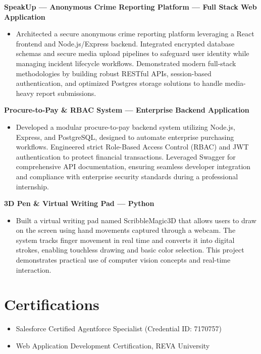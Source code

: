 \documentclass[10pt,letterpaper]{article}
\begin{document}
\vspace{4pt}
\noindent
\textbf{SpeakUp --- Anonymous Crime Reporting Platform --- Full Stack Web Application}
\begin{itemize}[leftmargin=0.2in, nosep, topsep=1pt]
    \item Architected a secure anonymous crime reporting platform leveraging a React frontend and Node.js/Express backend. Integrated encrypted database schemas and secure media upload pipelines to safeguard user identity while managing incident lifecycle workflows. Demonstrated modern full-stack methodologies by building robust RESTful APIs, session-based authentication, and optimized Postgres storage solutions to handle media-heavy report submissions.
\end{itemize}

\vspace{4pt}
\noindent
\textbf{Procure-to-Pay \& RBAC System --- Enterprise Backend Application}
\begin{itemize}[leftmargin=0.2in, nosep, topsep=1pt]
    \item Developed a modular procure-to-pay backend system utilizing Node.js, Express, and PostgreSQL, designed to automate enterprise purchasing workflows. Engineered strict Role-Based Access Control (RBAC) and JWT authentication to protect financial transactions. Leveraged Swagger for comprehensive API documentation, ensuring seamless developer integration and compliance with enterprise security standards during a professional internship.
\end{itemize}

\vspace{4pt}
\noindent
\textbf{3D Pen \& Virtual Writing Pad --- Python}
\begin{itemize}[leftmargin=0.2in, nosep, topsep=1pt]
    \item Built a virtual writing pad named ScribbleMagic3D that allows users to draw on the screen using hand movements captured through a webcam. The system tracks finger movement in real time and converts it into digital strokes, enabling touchless drawing and basic color selection. This project demonstrates practical use of computer vision concepts and real-time interaction.
\end{itemize}

\section{Certifications}
\begin{itemize}[leftmargin=0.2in, nosep]
    \item Salesforce Certified Agentforce Specialist (Credential ID: 7170757)
    \item Web Application Development Certification, REVA University
\end{itemize}
\end{document}
